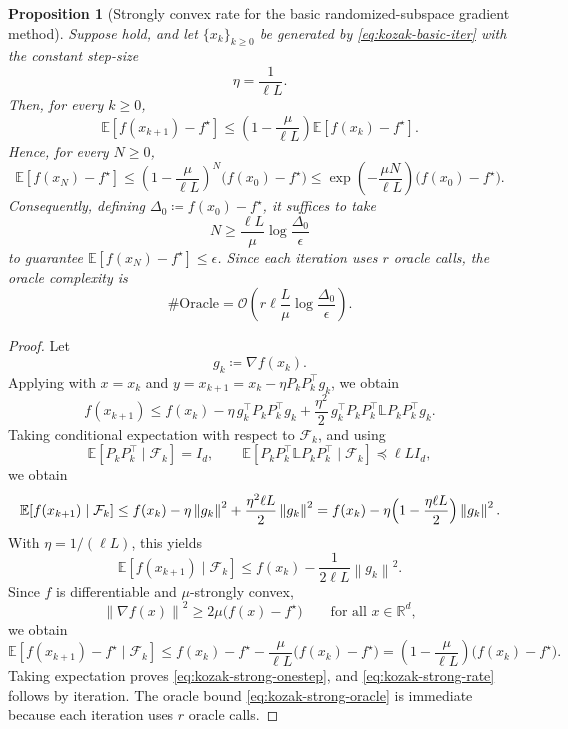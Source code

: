 \documentclass[10pt]{article}
\newtheorem{proposition}[proposition]{Proposition}
\newcommand{\E}{\mathbb{E}}
\newcommand{\F}{\mathcal{F}}
\newcommand{\R}{\mathbb{R}}
\newcommand{\norm}[1]{\left\|#1\right\|}
\newcommand{\Lmat}{\mathbb{L}}
\begin{document}
\begin{proposition}[Strongly convex rate for the basic randomized-subspace gradient method]
\label{prop:kozak-strong}
Suppose
 hold,
and let \(\{x_k\}_{k\ge0}\) be generated by
\eqref{eq:kozak-basic-iter} with the constant step-size
\[
\eta=\frac{1}{\ell L}.
\]
Then, for every \(k\ge 0\),
\begin{equation}
\E[f(x_{k+1})-f^\star]
\le
\left(1-\frac{\mu}{\ell L}\right)\E[f(x_k)-f^\star].
\label{eq:kozak-strong-onestep}
\end{equation}
Hence, for every \(N\ge 0\),
\begin{equation}
\E[f(x_N)-f^\star]
\le
\left(1-\frac{\mu}{\ell L}\right)^N \bigl(f(x_0)-f^\star\bigr)
\le
\exp\!\left(-\frac{\mu N}{\ell L}\right)\bigl(f(x_0)-f^\star\bigr).
\label{eq:kozak-strong-rate}
\end{equation}
Consequently, defining \(\Delta_0\coloneqq f(x_0)-f^\star\), it suffices to take
\[
N\ge \frac{\ell L}{\mu}\log\!{\frac{\Delta_0}{\epsilon}}
\]
to guarantee \(\E[f(x_N)-f^\star]\le \epsilon\). Since each iteration uses
\(r\) oracle calls, the oracle complexity is
\begin{equation}
\#\mathrm{Oracle}
=
\mathcal{O}\!\left(
r\ell \frac{L}{\mu}\log\frac{\Delta_0}{\epsilon}
\right).
\label{eq:kozak-strong-oracle}
\end{equation}
\end{proposition}

\begin{proof}
Let
\[
g_k\coloneqq \nabla f(x_k).
\]
Applying  with
\(x=x_k\) and \(y=x_{k+1}=x_k-\eta P_kP_k^\top g_k\), we obtain
\[
f(x_{k+1})
\le
f(x_k)-\eta\, g_k^\top P_kP_k^\top g_k
+\frac{\eta^2}{2}\, g_k^\top P_kP_k^\top \Lmat P_kP_k^\top g_k.
\]
Taking conditional expectation with respect to \(\F_k\), and using
\[
\E[P_kP_k^\top\mid \F_k]=I_d,
\qquad
\E[P_kP_k^\top \Lmat P_kP_k^\top\mid \F_k]\preceq \ell L I_d,
\]
we obtain
\[
\E[f(x_{k+1})\mid \F_k]
\le
f(x_k)-\eta\norm{g_k}^2+\frac{\eta^2\ell L}{2}\norm{g_k}^2
=
f(x_k)-\eta\Bigl(1-\frac{\eta\ell L}{2}\Bigr)\norm{g_k}^2.
\]
With \(\eta=1/(\ell L)\), this yields
\[
\E[f(x_{k+1})\mid \F_k]
\le
f(x_k)-\frac{1}{2\ell L}\norm{g_k}^2.
\]
Since \(f\) is differentiable and \(\mu\)-strongly convex,
\[
\norm{\nabla f(x)}^2 \ge 2\mu\bigl(f(x)-f^\star\bigr)
\qquad\text{for all }x\in\R^d,
\]
we obtain
\[
\E[f(x_{k+1})-f^\star\mid \F_k]
\le
f(x_k)-f^\star-\frac{\mu}{\ell L}\bigl(f(x_k)-f^\star\bigr)
=
\left(1-\frac{\mu}{\ell L}\right)\bigl(f(x_k)-f^\star\bigr).
\]
Taking expectation proves \eqref{eq:kozak-strong-onestep}, and
\eqref{eq:kozak-strong-rate} follows by iteration. The oracle bound
\eqref{eq:kozak-strong-oracle} is immediate because each iteration uses
\(r\) oracle calls.
\end{proof}
\end{document}
